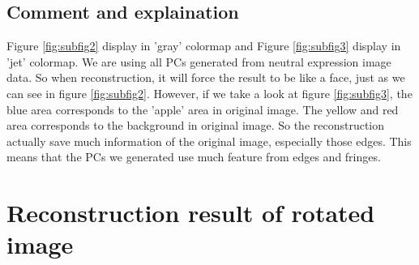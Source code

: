 \documentclass{article}
\begin{document}
\subsection{Comment and explaination}
Figure \ref{fig:subfig2} display in 'gray' colormap and Figure \ref{fig:subfig3} display in 'jet' colormap.
We are using all PCs generated from neutral expression image data. So when reconstruction, it will force the
result to be like a face, just as we can see in figure \ref{fig:subfig2}. However, if we take a look at figure
\ref{fig:subfig3}, the blue area corresponds to the 'apple' area in original image. The yellow and red area corresponds
to the background in original image. So the reconstruction actually save much information of the original image,
especially those edges. This means that the PCs we generated use much feature from edges and fringes.

\section{Reconstruction result of rotated image}
\end{document}
